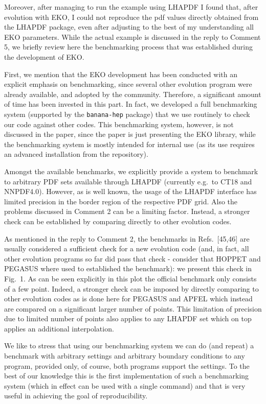 \documentclass[a4paper,11pt]{article}
\begin{document}
\begin{response}{
  Moreover, after managing to run the example using LHAPDF I found that,
  after evolution with EKO, I could not reproduce the pdf values directly
  obtained from the LHAPDF package, even after adjusting to the best of
  my understanding all EKO parameters.
}
While the actual example is discussed in the reply to Comment 5, we briefly review here the benchmarking
process that was established during the development of EKO.

First, we mention that the EKO development has been conducted with an explicit emphasis on benchmarking, since
several other evolution program were already available, and adopted by the community. Therefore, a significant
amount of time has been invested in this part.
In fact, we developed a full benchmarking system (supported by the \texttt{banana-hep} package) that we use
routinely to check our code against other codes.
This benchmarking system, however, is not discussed in the paper, since the paper is just presenting the EKO library, 
while the benchmarking system is mostly intended for internal use (as its use requires an advanced
installation from the repository).

Amongst the available benchmarks, we explicitly provide a system to benchmark to arbitrary PDF sets available
through LHAPDF (currently e.g.\ to CT18 and NNPDF4.0). However, as is well known, the usage of the LHAPDF
interface has limited precision in the border region of the respective PDF grid. Also the problems discussed in
Comment 2 can be a limiting factor. Instead, a stronger check can be established by comparing directly to other
evolution codes.

As mentioned in the reply to Comment 2, the benchmarks in Refs.~[45,46] are usually considered a sufficient check
for a new evolution code (and, in fact, all other evolution programs so far did pass that check - consider that
HOPPET and PEGASUS where used to established the benchmark): we present this check in Fig.~1.
As can be seen explicitly in this plot the official benchmark only consists of a few point. Indeed, a stronger
check can be imposed by directly comparing to other evolution codes as is done here for PEGASUS and APFEL which instead
are compared on a significant larger number of points. This limitation of precision due to limited number of points
also applies to any LHAPDF set which on top applies an additional interpolation.

We like to stress that using our benchmarking system we can do (and repeat) a benchmark with arbitrary settings and arbitrary boundary
conditions to any program, provided only, of course, both programs support the settings. To the best of our knowledge this is
the first implementation of such a benchmarking system (which in effect can be used with a single command) and that is very useful
in achieving the goal of reproducibility.


\end{response}
\end{document}

